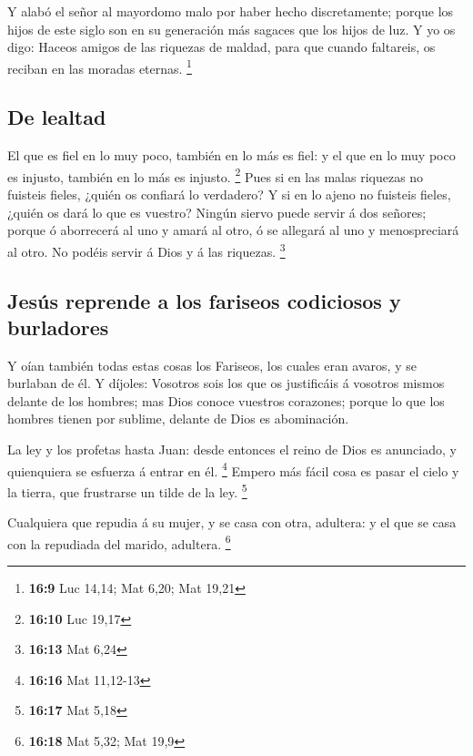  Y alabó el señor al mayordomo malo por haber hecho
discretamente; porque los hijos de este siglo son en su generación más
sagaces que los hijos de luz.  Y yo os digo: Haceos amigos
de las riquezas de maldad, para que cuando faltareis, os reciban en las
moradas eternas. \footnote{\textbf{16:9} Luc 14,14; Mat 6,20; Mat 19,21}

\hypertarget{de-lealtad}{%
\subsection{De lealtad}\label{de-lealtad}}

 El que es fiel en lo muy poco, también en lo más es
fiel: y el que en lo muy poco es injusto, también en lo más es injusto.
\footnote{\textbf{16:10} Luc 19,17}  Pues si en las malas
riquezas no fuisteis fieles, ¿quién os confiará lo verdadero?
 Y si en lo ajeno no fuisteis fieles, ¿quién os dará lo
que es vuestro?  Ningún siervo puede servir á dos
señores; porque ó aborrecerá al uno y amará al otro, ó se allegará al
uno y menospreciará al otro. No podéis servir á Dios y á las riquezas.
\footnote{\textbf{16:13} Mat 6,24}

\hypertarget{jesuxfas-reprende-a-los-fariseos-codiciosos-y-burladores}{%
\subsection{Jesús reprende a los fariseos codiciosos y
burladores}\label{jesuxfas-reprende-a-los-fariseos-codiciosos-y-burladores}}

 Y oían también todas estas cosas los Fariseos, los
cuales eran avaros, y se burlaban de él.  Y díjoles:
Vosotros sois los que os justificáis á vosotros mismos delante de los
hombres; mas Dios conoce vuestros corazones; porque lo que los hombres
tienen por sublime, delante de Dios es abominación.

 La ley y los profetas hasta Juan: desde entonces el
reino de Dios es anunciado, y quienquiera se esfuerza á entrar en él.
\footnote{\textbf{16:16} Mat 11,12-13}  Empero más fácil
cosa es pasar el cielo y la tierra, que frustrarse un tilde de la ley.
\footnote{\textbf{16:17} Mat 5,18}

 Cualquiera que repudia á su mujer, y se casa con otra,
adultera: y el que se casa con la repudiada del marido, adultera.
\footnote{\textbf{16:18} Mat 5,32; Mat 19,9}


